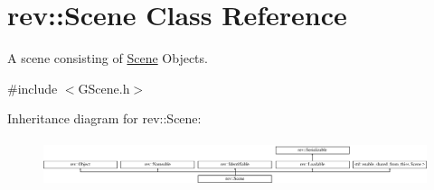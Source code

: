 \hypertarget{classrev_1_1_scene}{}\section{rev\+::Scene Class Reference}
\label{classrev_1_1_scene}


A scene consisting of \mbox{\hyperlink{classrev_1_1_scene}{Scene}} Objects.  




{\ttfamily \#include $<$G\+Scene.\+h$>$}

Inheritance diagram for rev\+::Scene\+:\begin{figure}[H]
\begin{center}
\leavevmode
\includegraphics[height=1.377049cm]{classrev_1_1_scene}
\end{center}
\end{figure}
